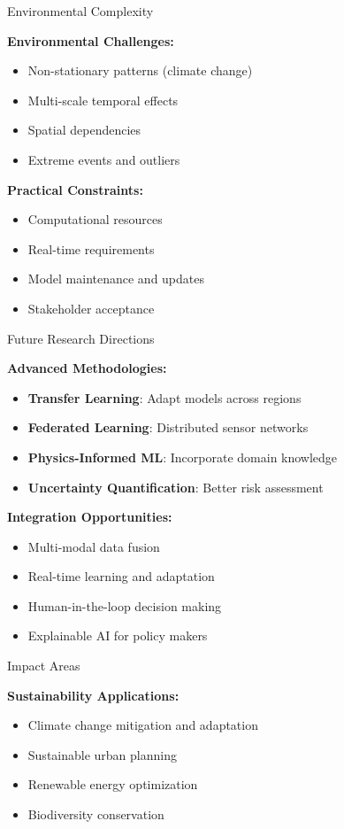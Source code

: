 \documentclass{sustainabilitylab}
\begin{document}
\begin{frame}{Environmental Complexity}

\textbf{Environmental Challenges:}
\begin{itemize}
  \item Non-stationary patterns (climate change)
  \item Multi-scale temporal effects
  \item Spatial dependencies
  \item Extreme events and outliers
\end{itemize}

\textbf{Practical Constraints:}
\begin{itemize}
  \item Computational resources
  \item Real-time requirements
  \item Model maintenance and updates
  \item Stakeholder acceptance
\end{itemize}

\end{frame}

\begin{frame}{Future Research Directions}

\textbf{Advanced Methodologies:}
\begin{itemize}
  \item \textbf{Transfer Learning}: Adapt models across regions
  \item \textbf{Federated Learning}: Distributed sensor networks
  \item \textbf{Physics-Informed ML}: Incorporate domain knowledge
  \item \textbf{Uncertainty Quantification}: Better risk assessment
\end{itemize}

\textbf{Integration Opportunities:}
\begin{itemize}
  \item Multi-modal data fusion
  \item Real-time learning and adaptation
  \item Human-in-the-loop decision making
  \item Explainable AI for policy makers
\end{itemize}

\end{frame}

\begin{frame}{Impact Areas}

\textbf{Sustainability Applications:}
\begin{itemize}
  \item Climate change mitigation and adaptation
  \item Sustainable urban planning
  \item Renewable energy optimization
  \item Biodiversity conservation
\end{itemize}

\end{frame}
\end{document}
